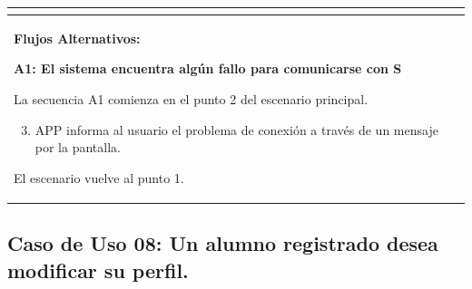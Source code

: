 \begin{longtable}{|l|p{5.5cm}|l|p{2cm}|l|p{1.9cm}|}
{    } \\ \hline

    \multicolumn{6}{|p{15cm}|}{ \textbf{Flujos Alternativos: }
    
    \textbf{A1: El sistema encuentra algún fallo para comunicarse con S}
    
    La secuencia A1 comienza en el punto 2 del escenario principal.
    \begin{enumerate}
        \setcounter{enumi}{2}
        \item APP informa al usuario el problema de conexión a través de un mensaje por la pantalla.
    \end{enumerate}

    El escenario vuelve al punto 1.

    } \\ \hline

\end{longtable}


\subsection{Caso de Uso 08: Un alumno registrado desea modificar su perfil.}

